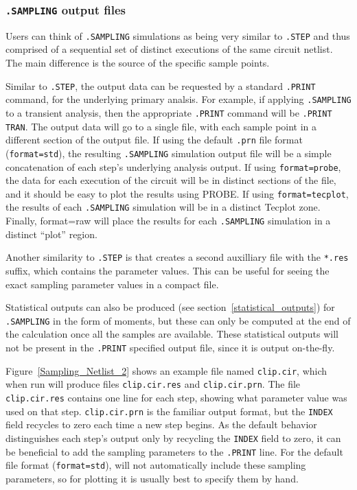 \subsubsection{\texttt{.SAMPLING} output files}
Users can think of \texttt{.SAMPLING} simulations as being very similar 
to \texttt{.STEP} and thus comprised of a sequential set of distinct executions
of the same circuit netlist. The main difference is the source of the specific sample points.

Similar to \texttt{.STEP}, the output data can be requested by a standard \texttt{.PRINT} command, for the underlying primary analsis.
For example, if applying \texttt{.SAMPLING} to a transient analysis, then the appropriate \texttt{.PRINT} command will be \texttt{.PRINT TRAN}.
The output data will go to a single file, with each sample point in a different section of the output file.
If using the default \texttt{.prn} file format (\texttt{format=std}), the 
resulting \texttt{.SAMPLING} simulation output file will be a simple concatenation of
each step's underlying analysis output.
If using \texttt{format=probe}, the data for each execution of the circuit
will be in distinct sections of the file, and it should be easy to 
plot the results using PROBE.  If using \texttt{format=tecplot}, 
the results of each \texttt{.SAMPLING} simulation will be in a distinct
Tecplot zone. Finally, format=raw will place the results for each \texttt{.SAMPLING} 
simulation in a distinct ``plot'' region. 

Another similarity to \texttt{.STEP} is that \Xyce{} creates a second auxilliary file with the \texttt{*.res} 
suffix, which contains the parameter values.    This can be useful for seeing the exact sampling parameter values in a compact file.

Statistical outputs can also be produced (see section~\ref{statistical_outputs}) 
for \texttt{.SAMPLING} in the form of moments, but these can only be computed 
at the end of the calculation once all the samples are available.  These statistical outputs will not
be present in the \texttt{.PRINT} specified output file, since it is output on-the-fly.

Figure~\ref{Sampling_Netlist_2} shows an example file named \verb+clip.cir+, which when run will produce files
\verb+clip.cir.res+ and \verb+clip.cir.prn+.  The file \verb+clip.cir.res+
contains one line for each step, showing what parameter value was used
on that step.  \verb+clip.cir.prn+ is the familiar output format, but
the \verb+INDEX+ field recycles to zero each time a new step begins.
As the default behavior distinguishes each step's output only by recycling 
the \verb+INDEX+ field to zero, it can be beneficial to add the sampling
parameters to the \verb+.PRINT+ line.   For the default file format 
(\texttt{format=std}), \Xyce{} will not automatically include these sampling parameters,
so for plotting it is usually best to specify them by hand.


